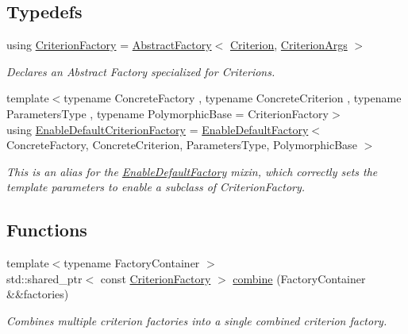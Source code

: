 \subsection*{Typedefs}
\begin{DoxyCompactItemize}
\item 
using \hyperlink{namespacegko_1_1stop_ab12a51109c50b35ec36dc5a393d6a9a0}{Criterion\+Factory} = \hyperlink{classgko_1_1AbstractFactory}{Abstract\+Factory}$<$ \hyperlink{classgko_1_1stop_1_1Criterion}{Criterion}, \hyperlink{structgko_1_1stop_1_1CriterionArgs}{Criterion\+Args} $>$
\begin{DoxyCompactList}\small\item\em Declares an Abstract Factory specialized for Criterions. \end{DoxyCompactList}\item 
{\footnotesize template$<$typename Concrete\+Factory , typename Concrete\+Criterion , typename Parameters\+Type , typename Polymorphic\+Base  = Criterion\+Factory$>$ }\\using \hyperlink{namespacegko_1_1stop_ab045b6fd7571f3234d9a63a5ee5a2252}{Enable\+Default\+Criterion\+Factory} = \hyperlink{classgko_1_1EnableDefaultFactory}{Enable\+Default\+Factory}$<$ Concrete\+Factory, Concrete\+Criterion, Parameters\+Type, Polymorphic\+Base $>$
\begin{DoxyCompactList}\small\item\em This is an alias for the \hyperlink{classgko_1_1EnableDefaultFactory}{Enable\+Default\+Factory} mixin, which correctly sets the template parameters to enable a subclass of Criterion\+Factory. \end{DoxyCompactList}\end{DoxyCompactItemize}
\subsection*{Functions}
\begin{DoxyCompactItemize}
\item 
{\footnotesize template$<$typename Factory\+Container $>$ }\\std\+::shared\+\_\+ptr$<$ const \hyperlink{namespacegko_1_1stop_ab12a51109c50b35ec36dc5a393d6a9a0}{Criterion\+Factory} $>$ \hyperlink{group__stop_ga3a3325b3a7660501f3bb72d08b09f2d2}{combine} (Factory\+Container \&\&factories)
\begin{DoxyCompactList}\small\item\em Combines multiple criterion factories into a single combined criterion factory. \end{DoxyCompactList}\end{DoxyCompactItemize}


